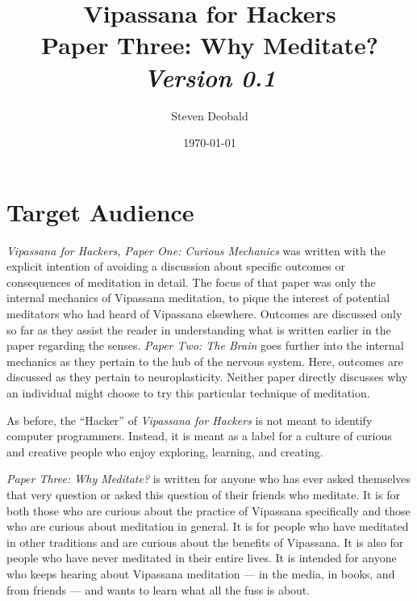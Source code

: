 \documentclass[a4paper, amsfonts, amssymb, amsmath, reprint, showkeys, nofootinbib, twoside]{revtex4-1}
\begin{document}
\title{%
  \large{Vipassana for Hackers} \\
  \Huge{Paper Three: Why Meditate?} \\
  \large\textit{Version 0.1}
}
\author{Steven Deobald}
\date{\today}

\begin{abstract}
\end{abstract}


\maketitle


\section{Target Audience}

\textit{Vipassana for Hackers, Paper One: Curious Mechanics} was written with the
explicit intention of avoiding a discussion about specific
outcomes or consequences of meditation in detail. The focus of that paper was only
the internal mechanics of Vipassana meditation, to pique the interest of potential
meditators who had heard of Vipassana elsewhere. Outcomes are discussed only so far
as they assist the reader in understanding what is written earlier in the paper
regarding the senses. \textit{Paper Two: The Brain} goes further into the internal
mechanics as they pertain to the
hub of the nervous system. Here, outcomes are discussed as they pertain to
neuroplasticity. Neither paper directly discusses why an individual might choose to
try this particular technique of meditation.

As before, the ``Hacker'' of \textit{Vipassana for Hackers} is not meant to identify
computer programmers. Instead, it is meant as a label for a culture of curious and
creative people who enjoy exploring, learning, and creating.

\textit{Paper Three: Why Meditate?} is written for anyone who has ever asked
themselves that very question or asked this question of their friends who
meditate. It is for both those who are curious about the practice of Vipassana
specifically and those who are curious about meditation in general. It is for people
who have meditated in other traditions and are curious about the benefits of
Vipassana. It is also for people who have never meditated in their entire lives. It
is intended for anyone who keeps hearing about Vipassana meditation --- in the media,
in books, and from friends --- and wants to learn what all the fuss is about.
\end{document}
